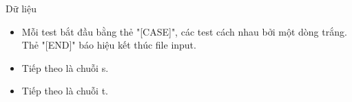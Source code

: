 Dữ liệu
\begin{itemize}
	\item     Mỗi test bắt đầu bằng thẻ "[CASE]", các test cách nhau bởi một dòng trắng. Thẻ "[END]" báo hiệu kết thúc file input.   
	\item     Tiếp theo là chuỗi s.   
	\item     Tiếp theo là chuỗi t.   
\end{itemize}